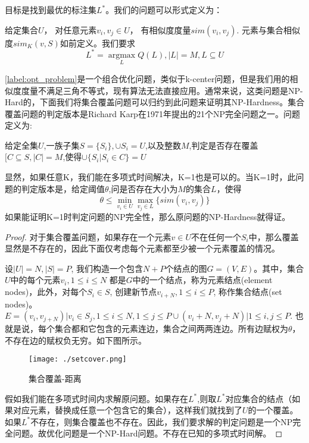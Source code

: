 目标是找到最优的标注集$L^*$。我们的问题可以形式定义为：
\begin{problem}\label{label:opt_problem}
给定集合$U$， 对任意元素$v_i, v_j \in U$， 有相似度度量$sim(v_i,v_j)$. 元素与集合相似度$sim_K(v, S)$如前定义。我们要求
\[
        {L^*} = \mathop {\arg \max }\limits_L Q(L),|L| = M, L \subseteq U
\]
\end{problem}

\ref{label:opt_problem}是一个组合优化问题，类似于k-center问题，但是我们用的相似度度量不满足三角不等式，现有算法无法直接应用。通常来说，这类问题是NP-Hard的，下面我们将集合覆盖问题可以归约到此问题来证明其NP-Hardness。集合覆盖问题的判定版本是Richard Karp在1971年提出的21个NP完全问题之一。问题定义为:

\begin{problem}[集合覆盖]
给定全集$U$,一族子集$S=\{S_i\}, \cup {S_i} = U$,以及整数$M$,判定是否存在覆盖$[C \subseteq S,|C|=M$,使得$\cup \{ {S_i}|{S_i} \in C\}  = U$
\end{problem}

显然，如果任意K，我们能在多项式时间解决，K=1也是可以的。当K=1时，此问题的判定版本是，给定阈值$\theta$,问是否存在大小为$M$的集合$L$，使得
\[
    \theta  \le \mathop {\min }\limits_{{v_i} \in U} \mathop {\max }\limits_{{v_j} \in L} \{ sim({v_i},{v_j})\} 
\]
如果能证明K=1时判定问题的NP完全性，那么原问题的NP-Hardness就得证。

\begin{proof}
对于集合覆盖问题，如果存在一个元素$v\in U$不在任何一个$S_i$中，那么覆盖显然是不存在的，因此下面仅考虑每个元素都至少被一个元素覆盖的情况。

设$|U| = N, |S| = P$, 我们构造一个包含$N+P$个结点的图$G=(V,E)$。其中，集合$U$中的每个元素$v_i, 1 \le i \le N $ 都是$G$中的一个结点，称为元素结点(element nodes)，此外，对每个$S_i \in S$, 创建新节点$v_{i+N}, 1 \le i \le P$, 称作集合结点(set nodes)。$E={(v_i, v_{j+N}) | v_i \in S_j, 1\le i \le N, 1\le j \le P} \cup {(v_i+N, v_j+N) | 1 \le i,j \le P}$. 也就是说，每个集合都和它包含的元素连边，集合之间两两连边。所有边赋权为$\theta$，不存在边的赋权负无穷。如下图所示。
\begin{figure}[htbp]
\centering
\texttt{[image: ./setcover.png]}
\caption{集合覆盖-距离}
\label{fig:setcover}
\end{figure}


假如我们能在多项式时间内求解原问题。如果存在$L^*$,则取$L^*$对应集合的结点（如果对应元素，替换成任意一个包含它的集合），这样我们就找到了$U$的一个覆盖。如果$L^*$不存在，则集合覆盖也不存在。因此，我们要求解的判定问题是一个NP完全问题。故优化问题是一个NP-Hard问题。不存在已知的多项式时间解。
\end{proof}


